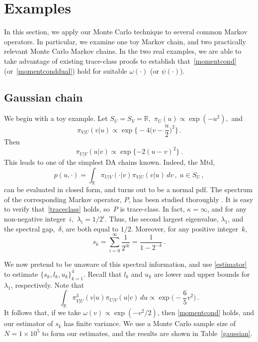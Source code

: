 \documentclass[11pt]{article}
\begin{document}
	
	
	\section{Examples} \label{illustration} In this section,
        we apply our Monte Carlo technique to several common Markov
        operators.  In particular, we examine one toy Markov chain,
        and two practically relevant Monte Carlo Markov chains.  In
        the two real examples, we are able to take advantage of
        existing trace-class proofs to establish
        that~\eqref{momentcond} (or~\eqref{momentconddual}) hold for
        suitable $\omega(\cdot)$ (or $\psi(\cdot)$).
	
	\subsection{Gaussian chain}
	We begin with a toy example.  Let $S_U=S_V=\mathbb{R},$
        $\pi_U(u) \propto \exp(-u^2),$ and
	\[
	\pi_{V|U}(v|u) \propto \exp \Big\{ -4\Big(v-\frac{u}{2}\Big)^2
        \Big\} \,.
	\]
	Then
	\[
	\pi_{U|V} (u|v) \propto \exp \{ -2(u-v)^2 \} \,.
	\]
	This leads to one of the simplest DA chains known.  Indeed,
        the Mtd,
	\[
	p(u,\cdot) = \int_{\mathbb{R}} \pi_{U|V}(\cdot|v)
        \pi_{V|U}(v|u) \, dv \,, \; u \in S_U \,,
	\]
	can be evaluated in closed form, and turns out to be a normal
        pdf.  The spectrum of the corresponding Markov operator, $P$,
        has been studied thoroughly \citep[see
        e.g.][]{diaconis2008gibbs}.  It is easy to verify
        that~\eqref{traceclass} holds, so~$P$ is trace-class.  In
        fact, $\kappa = \infty$, and for any non-negative integer~$i,$
        $\lambda_i = 1/2^i$.  Thus, the second largest eigenvalue,
        $\lambda_1$, and the spectral gap,~$\delta$, are both equal to
        $1/2$.  Moreover, for any positive integer~$k$,
	\[
	s_k = \sum_{i=0}^{\infty} \frac{1}{2^{ik}} =
        \frac{1}{1-2^{-k}} \,.
	\]
	
        We now pretend to be unaware of this spectral information, and
        use \eqref{estimator} to estimate
        $\{s_k,l_k,u_k\}_{k=1}^4$.  Recall that $l_k$ and $u_k$ are
        lower and upper bounds for $\lambda_1$, respectively.  Note
        that
	\[
	\int_{\mathbb{R}} \pi^3_{V|U}(v|u) \pi_{U|V} (u|v) \, du
        \propto \exp \Big( -\frac{6}{5}v^2 \Big) \,.
	\]
        It follows that, if we take $\omega(v) \propto \exp(-v^2/2)$,
        then \eqref{momentcond} holds, and our estimator of $s_k$ has
        finite variance.  We use a Monte Carlo sample size of $N = 1
        \times 10^5$ to form our estimates, and the results are shown
        in Table~\ref{gaussian}.
        
\end{document}
